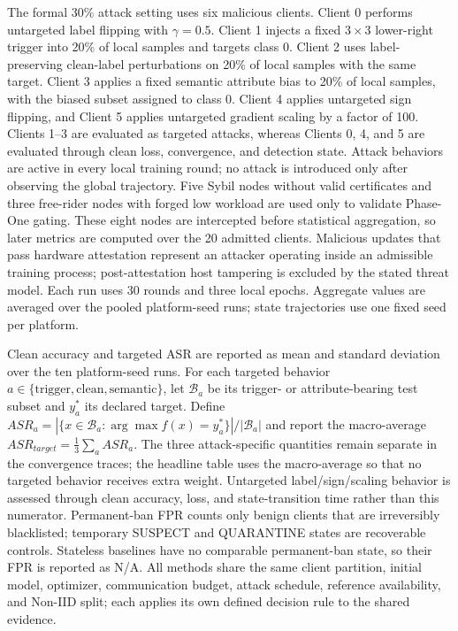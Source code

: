 \documentclass[runningheads,orivec]{llncs}
\begin{document}
The formal 30\% attack setting uses six malicious clients. Client 0 performs untargeted label flipping with $\gamma=0.5$. Client 1 injects a fixed $3\times3$ lower-right trigger into 20\% of local samples and targets class 0. Client 2 uses label-preserving clean-label perturbations on 20\% of local samples with the same target. Client 3 applies a fixed semantic attribute bias to 20\% of local samples, with the biased subset assigned to class 0. Client 4 applies untargeted sign flipping, and Client 5 applies untargeted gradient scaling by a factor of 100. Clients 1--3 are evaluated as targeted attacks, whereas Clients 0, 4, and 5 are evaluated through clean loss, convergence, and detection state. Attack behaviors are active in every local training round; no attack is introduced only after observing the global trajectory. Five Sybil nodes without valid certificates and three free-rider nodes with forged low workload are used only to validate Phase-One gating. These eight nodes are intercepted before statistical aggregation, so later metrics are computed over the 20 admitted clients. Malicious updates that pass hardware attestation represent an attacker operating inside an admissible training process; post-attestation host tampering is excluded by the stated threat model. Each run uses 30 rounds and three local epochs. Aggregate values are averaged over the pooled platform-seed runs; state trajectories use one fixed seed per platform.

Clean accuracy and targeted ASR are reported as mean and standard deviation over the ten platform-seed runs. For each targeted behavior $a\in\{\mathrm{trigger},\mathrm{clean},\mathrm{semantic}\}$, let $\mathcal{B}_a$ be its trigger- or attribute-bearing test subset and $y_a^*$ its declared target. Define $ASR_a=|\{x\in\mathcal{B}_a:\arg\max f(x)=y_a^*\}|/|\mathcal{B}_a|$ and report the macro-average $ASR_{target}=\frac{1}{3}\sum_a ASR_a$. The three attack-specific quantities remain separate in the convergence traces; the headline table uses the macro-average so that no targeted behavior receives extra weight. Untargeted label/sign/scaling behavior is assessed through clean accuracy, loss, and state-transition time rather than this numerator. Permanent-ban FPR counts only benign clients that are irreversibly blacklisted; temporary SUSPECT and QUARANTINE states are recoverable controls. Stateless baselines have no comparable permanent-ban state, so their FPR is reported as N/A. All methods share the same client partition, initial model, optimizer, communication budget, attack schedule, reference availability, and Non-IID split; each applies its own defined decision rule to the shared evidence.
\end{document}
